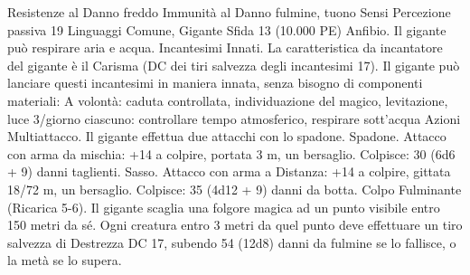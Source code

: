 \begin{multicols}{2}
Resistenze al Danno freddo
Immunità al Danno fulmine, tuono
Sensi Percezione passiva 19
Linguaggi Comune, Gigante
Sfida 13 (10.000 PE)
Anfibio. Il gigante può respirare aria e acqua.
Incantesimi Innati. La caratteristica da incantatore del gigante è
il Carisma (DC dei tiri salvezza degli incantesimi 17). Il gigante
può lanciare questi incantesimi in maniera innata, senza bisogno
di componenti materiali:
A volontà: caduta controllata, individuazione del magico,
levitazione, luce
3/giorno ciascuno: controllare tempo atmosferico, respirare
sott'acqua
Azioni
Multiattacco. Il gigante effettua due attacchi con lo spadone.
Spadone. Attacco con arma da mischia: +14 a colpire, portata 3
m, un bersaglio.
Colpisce: 30 (6d6 + 9) danni taglienti.
Sasso. Attacco con arma a Distanza: +14 a colpire, gittata 18/72
m, un bersaglio.
Colpisce: 35 (4d12 + 9) danni da botta.
Colpo Fulminante (Ricarica 5-6). Il gigante scaglia una folgore
magica ad un punto visibile entro 150 metri da sé. Ogni creatura
entro 3 metri da quel punto deve effettuare un tiro salvezza di
Destrezza DC 17, subendo 54 (12d8) danni da fulmine se lo
fallisce, o la metà se lo supera.
 

\end{multicols}
